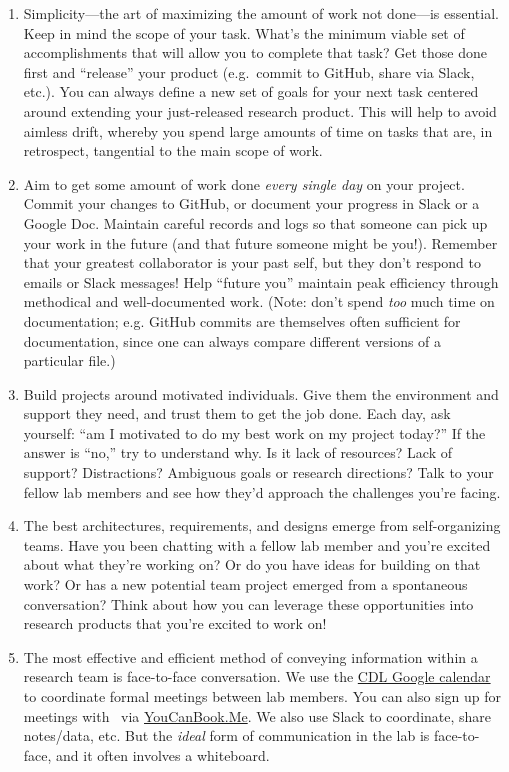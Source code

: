 \documentclass{tufte-book} %
\begin{document}
\begin{enumerate}
\item Simplicity---the art of maximizing the amount of work not
  done---is essential.  Keep in mind the scope of your task.  What's
  the minimum viable set of accomplishments that will allow you to
  complete that task?  Get those done first and ``release'' your product
  (e.g.\ commit to GitHub, share via Slack, etc.).  You can always
  define a new set of goals for your next task centered around
  extending your just-released research product.  This will help to
  avoid aimless drift, whereby you spend large amounts of time on
  tasks that are, in retrospect, tangential to the main scope of work.

\item Aim to get some amount of work done \textit{every single day} on
  your project.  Commit your changes to GitHub, or document your
  progress in Slack or a Google Doc.  Maintain careful records and
  logs so that someone can pick up your work in the future (and that
  future someone might be you!).  Remember that your greatest
  collaborator is your past self, but they don't respond to emails
  or Slack messages!  Help ``future you'' maintain peak efficiency
  through methodical and well-documented work.  (Note: don't spend
  \textit{too} much time on documentation; e.g. GitHub commits are
  themselves often sufficient for documentation, since one can always
  compare different versions of a particular file.)

\item Build projects around motivated individuals.  Give them the
  environment and support they need, and trust them to get the job
  done.  Each day, ask yourself: ``am I motivated to do my best work
  on my project today?''  If the answer is ``no,'' try to understand
  why.  Is it lack of resources?  Lack of support?  Distractions?
  Ambiguous goals or research directions?  Talk to your fellow lab
  members and see how they'd approach the challenges you're facing.

\item The best architectures, requirements, and designs emerge from
  self-organizing teams.  Have you been chatting with a fellow lab
  member and you're excited about what they're working on?  Or do you
  have ideas for building on that work?  Or has a new potential team
  project emerged from a spontaneous conversation?  Think about how
  you can leverage these opportunities into research products that
  you're excited to work on!

\item The most effective and efficient method of conveying information
  within a research team is face-to-face conversation.  We use the
  \hyperref[sec: scheduling]{CDL Google calendar} to coordinate formal
  meetings between lab members.  You can also sign up for meetings
  with \director~via
  \href{https://context-lab.youcanbook.me/}{YouCanBook.Me}.  We also
  use Slack to coordinate, share notes/data, etc.  But the
  \textit{ideal} form of communication in the lab is face-to-face, and
  it often involves a whiteboard.


\end{enumerate}
\end{document}
